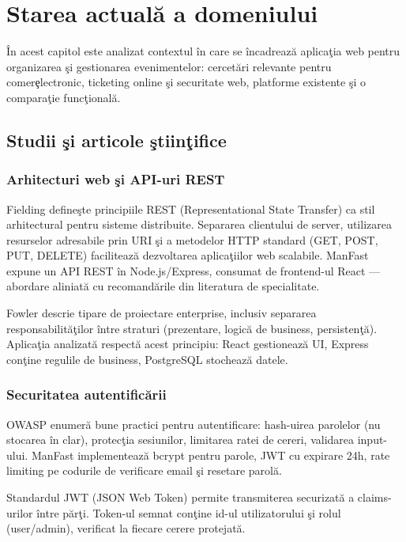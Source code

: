 \chapter{Starea actual\u a a domeniului}

\^In acest capitol este analizat contextul \^in care se \^incadreaz\u a aplica\c tia web pentru organizarea \c si gestionarea evenimentelor: cercet\u ari relevante pentru comer\c electronic, ticketing online \c si securitate web, platforme existente \c si o compara\c tie func\c tional\u a.

\section{Studii \c si articole \c stiin\c tifice}

\subsection{Arhitecturi web \c si API-uri REST}

Fielding \cite{fielding2000} define\c ste principiile REST (Representational State Transfer) ca stil arhitectural pentru sisteme distribuite. Separarea clientului de server, utilizarea resurselor adresabile prin URI \c si a metodelor HTTP standard (GET, POST, PUT, DELETE) faciliteaz\u a dezvoltarea aplica\c tiilor web scalabile. ManFast expune un API REST \^in Node.js/Express, consumat de frontend-ul React --- abordare aliniat\u a cu recomand\u arile din literatura de specialitate.

Fowler \cite{fowler2002} descrie tipare de proiectare enterprise, inclusiv separarea responsabilit\u a\c tilor \^intre straturi (prezentare, logic\u a de business, persisten\c t\u a). Aplica\c tia analizat\u a respect\u a acest principiu: React gestioneaz\u a UI, Express con\c tine regulile de business, PostgreSQL stocheaz\u a datele.

\subsection{Securitatea autentific\u arii}

OWASP \cite{owasp2024} enumer\u a bune practici pentru autentificare: hash-uirea parolelor (nu stocarea \^in clar), protec\c tia sesiunilor, limitarea ratei de cereri, validarea input-ului. ManFast implementeaz\u a bcrypt pentru parole, JWT cu expirare 24h, rate limiting pe codurile de verificare email \c si resetare parol\u a.

Standardul JWT (JSON Web Token) \cite{jwt2015} permite transmiterea securizat\u a a claims-urilor \^intre p\u ar\c ti. Token-ul semnat con\c tine id-ul utilizatorului \c si rolul (user/admin), verificat la fiecare cerere protejat\u a.

